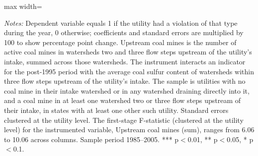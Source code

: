 \begin{table}[htbp]
{\begin{adjustbox}{max width=\linewidth}
\begin{tabular}
\bottomrule
\end{tabular}
\end{adjustbox}
}
\begin{minipage}{\linewidth}
\vspace{4pt}
\footnotesize
\raggedright
\textit{Notes:} Dependent variable equals 1 if the utility had a violation of that type during the year, 0 otherwise; coefficients and standard errors are multiplied by 100 to show percentage point change. Upstream coal mines is the number of active coal mines in watersheds two and three flow steps upstream of the utility's intake, summed across those watersheds. The instrument interacts an indicator for the post-1995 period with the average coal sulfur content of watersheds within three flow steps upstream of the utility's intake. The sample is utilities with no coal mine in their intake watershed or in any watershed draining directly into it, and a coal mine in at least one watershed two or three flow steps upstream of their intake, in states with at least one other such utility. Standard errors clustered at the utility level. The first-stage F-statistic (clustered at the utility level) for the instrumented variable, Upstream coal mines (sum), ranges from 6.06 to 10.06 across columns. Sample period 1985--2005. *** p$<$0.01, ** p$<$0.05, * p$<$0.1.
\end{minipage}
\end{table}
